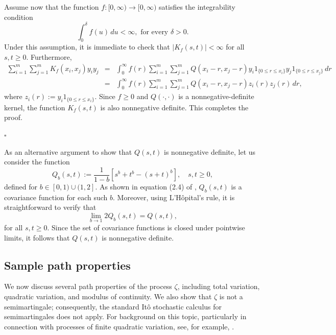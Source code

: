 \documentclass[preprint,12pt,authoryear]{elsarticle}
\begin{document}
Assume now that the function \( f: [0,\infty) \to [0,\infty) \) satisfies the integrability condition
\begin{equation}\label{Integrability-condition-appendix}
\int_0^\delta f(u) \, du < \infty, \text{ for every } \delta > 0.
\end{equation}
Under this assumption, it is immediate to check that \( |K_f(s,t)| < \infty \) for all \( s,t \geq 0 \). Furthermore,
\begin{eqnarray*}
\sum_{i=1}^m \sum_{j=1}^m K_f(x_i, x_j) y_i y_j &=& \int_0^\infty f(r) \sum_{i=1}^m \sum_{j=1}^m Q(x_i - r, x_j - r) y_i 1_{\{0 \leq r \leq x_i\}} y_j 1_{\{0 \leq r \leq x_j\}} \, dr \\
&=& \int_0^\infty f(r) \sum_{i=1}^m \sum_{j=1}^m Q(x_i - r, x_j - r) z_i(r) z_j(r) \, dr,
\end{eqnarray*}
where \( z_i (r):= y_i 1_{\{0 \leq r \leq x_i\}} \). Since \( f \geq 0 \) and \(Q(\cdot,\cdot)\) is a nonnegative-definite kernel, the function \( K_f (s,t)\) is also nonnegative definite. This completes the proof.

\hfill \(\square\)
\begin{rem}
    As an alternative argument to show that \( Q(s,t) \) is nonnegative definite, let us consider the function  
\[
Q_b(s,t) := \frac{1}{1-b}\left[s^b + t^b - (s + t)^b\right], \quad s, t \geq 0,
\]
defined for \( b \in [0,1) \cup (1,2] \). As shown in equation (2.4) of \cite{BojParti}, \( Q_b(s,t) \) is a covariance function for each such \( b \). 
Moreover, using L’Hôpital’s rule, it is straightforward to verify that
\[
\lim_{b \to 1} 2 Q_b(s,t) = Q(s,t),
\]
for all \( s, t \geq 0 \). Since the set of covariance functions is closed under pointwise limits, it follows that \( Q(s,t) \) is nonnegative definite.
\end{rem}




\subsection{Sample path properties}\label{memoryp}
We now discuss several path properties of the process \(\zeta\), including total variation, quadratic variation, and modulus of continuity. We also show that \(\zeta\) is not a semimartingale; consequently, the standard It\^o stochastic calculus for semimartingales does not apply. For background on this topic, particularly in connection with processes of finite quadratic variation, see, for example, \cite{ruso}.
\end{document}
